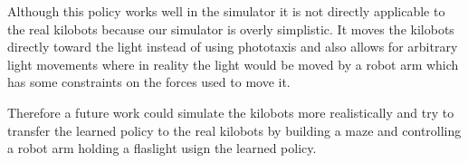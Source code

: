 \documentclass[twoside]{article}
\begin{document}
Although this policy works well in the simulator it is not directly applicable
to the real kilobots because our simulator is overly simplistic. It moves
the kilobots directly toward the light instead of using phototaxis and also
allows for arbitrary light movements where in reality the light would be moved
by a robot arm which has some constraints on the forces used to move it.

Therefore a future work could simulate the kilobots more realistically and try
to transfer the learned policy to the real kilobots by building a maze and
controlling a robot arm holding a flaslight usign the learned policy.



\end{document}
